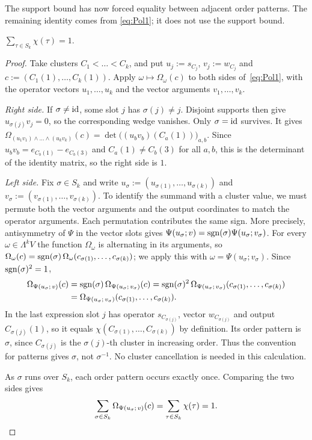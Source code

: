 The support bound has now forced equality between adjacent order patterns. The remaining identity comes from
\eqref{eq:Pol1}; it does not use the support bound.

\begin{lemma}\label{lem:D}
$\sum_{\tau\in S_k}\chi(\tau)=1$.
\end{lemma}

\begin{proof}
Take clusters $C_1<\dots<C_k$, and put $u_j:=s_{C_j}$, $v_j:=w_{C_j}$ and
$c:=(C_1(1),\dots,C_k(1))$. Apply $\omega\mapsto\Omega_\omega(c)$ to both sides of~\eqref{eq:Pol1}, with the operator
vectors $u_1,\dots,u_k$ and the vector arguments $v_1,\dots,v_k$.

\emph{Right side.} If $\sigma\ne\mathrm{id}$, some slot $j$ has $\sigma(j)\ne j$. Disjoint supports then give
$u_{\sigma(j)}v_j=0$, so the corresponding wedge vanishes. Only $\sigma=\mathrm{id}$ survives. It gives $\Omega_{(u_1v_1)\wedge\dots\wedge(u_kv_k)}(c)=\det\bigl((u_bv_b)(C_a(1))\bigr)_{a,b}$. Since
$u_bv_b=e_{C_b(1)}-e_{C_b(3)}$ and $C_a(1)\ne C_b(3)$ for all $a,b$, this is the determinant of the identity matrix, so
the right side is $1$.

\emph{Left side.} Fix $\sigma\in S_k$ and write $u_\sigma:=(u_{\sigma(1)},\dots,u_{\sigma(k)})$ and
$v_\sigma:=(v_{\sigma(1)},\dots,v_{\sigma(k)})$. To identify the summand with a cluster value, we must permute both the
vector arguments and the output coordinates to match the operator arguments. Each permutation contributes the same
sign. More precisely, antisymmetry of $\Psi$ in the vector slots gives
$\Psi(u_\sigma;v)=\operatorname{sgn}(\sigma)\Psi(u_\sigma;v_\sigma)$. For every $\omega\in\Lambda^kV$ the function $\Omega_\omega$ is
alternating in its arguments, so $\Omega_\omega(c)=\operatorname{sgn}(\sigma)\,\Omega_\omega(c_{\sigma(1)},\dots,c_{\sigma(k)})$; we
apply this with $\omega=\Psi(u_\sigma;v_\sigma)$. Since $\operatorname{sgn}(\sigma)^2=1$,
\begin{align*}
\Omega_{\Psi(u_\sigma;\,v)}(c)&=\operatorname{sgn}(\sigma)\,\Omega_{\Psi(u_\sigma;\,v_\sigma)}(c)
=\operatorname{sgn}(\sigma)^2\,\Omega_{\Psi(u_\sigma;\,v_\sigma)}(c_{\sigma(1)},\dots,c_{\sigma(k)})\\
&=\Omega_{\Psi(u_\sigma;\,v_\sigma)}(c_{\sigma(1)},\dots,c_{\sigma(k)}).
\end{align*}
In the last expression slot $j$ has operator $s_{C_{\sigma(j)}}$, vector $w_{C_{\sigma(j)}}$ and output
$C_{\sigma(j)}(1)$, so it equals $\chi(C_{\sigma(1)},\dots,C_{\sigma(k)})$ by definition. Its order pattern is $\sigma$,
since $C_{\sigma(j)}$ is the $\sigma(j)$\nobreakdash-th cluster in increasing order. Thus the convention for patterns
gives $\sigma$, not $\sigma^{-1}$. No cluster cancellation is needed in this calculation.

As $\sigma$ runs over $S_k$, each order pattern occurs exactly once. Comparing the two sides gives
\[
\sum_{\sigma\in S_k}\Omega_{\Psi(u_\sigma;\,v)}(c)=\sum_{\tau\in S_k}\chi(\tau)=1 .\qedhere
\]
\end{proof}

